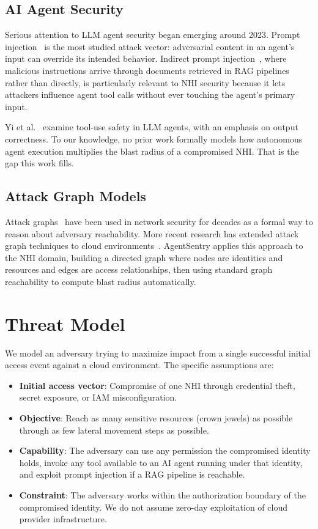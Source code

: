 \documentclass[conference]{IEEEtran}
\begin{document}
\subsection{AI Agent Security}

Serious attention to LLM agent security began emerging around 2023. Prompt
injection~\cite{perez2022} is the most studied attack vector: adversarial
content in an agent's input can override its intended behavior. Indirect prompt
injection~\cite{greshake2023}, where malicious instructions arrive through
documents retrieved in RAG pipelines rather than directly, is particularly
relevant to NHI security because it lets attackers influence agent tool calls
without ever touching the agent's primary input.

Yi et al.~\cite{yi2023} examine tool-use safety in LLM agents, with an
emphasis on output correctness. To our knowledge, no prior work formally models
how autonomous agent execution multiplies the blast radius of a compromised
NHI. That is the gap this work fills.

\subsection{Attack Graph Models}

Attack graphs~\cite{sheyner2002} have been used in network security for
decades as a formal way to reason about adversary reachability. More recent
research has extended attack graph techniques to cloud
environments~\cite{orca2023, wiz2023}. AgentSentry applies this approach to
the NHI domain, building a directed graph where nodes are identities and
resources and edges are access relationships, then using standard graph
reachability to compute blast radius automatically.

\section{Threat Model}

We model an adversary trying to maximize impact from a single successful
initial access event against a cloud environment. The specific assumptions are:

\begin{itemize}
  \item \textbf{Initial access vector}: Compromise of one NHI through credential
        theft, secret exposure, or IAM misconfiguration.
  \item \textbf{Objective}: Reach as many sensitive resources (crown jewels) as
        possible through as few lateral movement steps as possible.
  \item \textbf{Capability}: The adversary can use any permission the compromised
        identity holds, invoke any tool available to an AI agent running under
        that identity, and exploit prompt injection if a RAG pipeline is reachable.
  \item \textbf{Constraint}: The adversary works within the authorization boundary
        of the compromised identity. We do not assume zero-day exploitation of
        cloud provider infrastructure.
\end{itemize}
\end{document}

